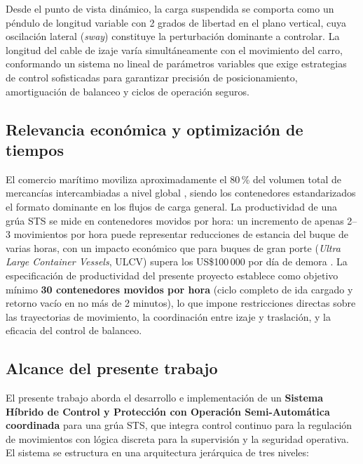 \documentclass[12pt, a4paper]{article}
\begin{document}
Desde el punto de vista dinámico, la carga suspendida se comporta como un péndulo de
longitud variable con 2 grados de libertad en el plano vertical, cuya oscilación lateral
(\textit{sway}) constituye la perturbación dominante a controlar. La longitud del cable
de izaje varía simultáneamente con el movimiento del carro, conformando un sistema no
lineal de parámetros variables que exige estrategias de control sofisticadas para
garantizar precisión de posicionamiento, amortiguación de balanceo y ciclos de operación
seguros.

\subsection*{Relevancia económica y optimización de tiempos}

El comercio marítimo moviliza aproximadamente el 80\,\% del volumen total de mercancías
intercambiadas a nivel global \cite{unctad2023}, siendo los contenedores estandarizados
el formato dominante en los flujos de carga general. La productividad de una grúa STS
se mide en contenedores movidos por hora: un incremento de apenas 2--3 movimientos por
hora puede representar reducciones de estancia del buque de varias horas, con un impacto
económico que para buques de gran porte (\textit{Ultra Large Container Vessels}, ULCV)
supera los US\$100\,000 por día de demora \cite{drewry2022}. La especificación de
productividad del presente proyecto establece como objetivo mínimo \textbf{30
contenedores movidos por hora} (ciclo completo de ida cargado y retorno vacío en no más
de 2 minutos), lo que impone restricciones directas sobre las trayectorias de movimiento,
la coordinación entre izaje y traslación, y la eficacia del control de balanceo.

\subsection*{Alcance del presente trabajo}

El presente trabajo aborda el desarrollo e implementación de un \textbf{Sistema Híbrido
de Control y Protección con Operación Semi-Automática coordinada} para una grúa STS,
que integra control continuo para la regulación de movimientos con lógica discreta para
la supervisión y la seguridad operativa. El sistema se estructura en una arquitectura
jerárquica de tres niveles:
\end{document}
